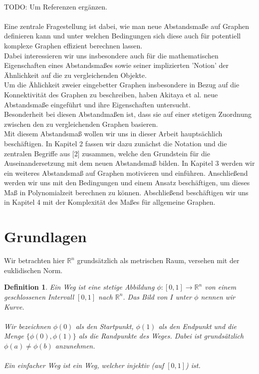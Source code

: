 \documentclass[a4paper, 12pt, twoside]{article}
\theoremstyle{Format1} %
\newtheorem{Def}{Definition}[section]       %
\begin{document}
\\
TODO: Um Referenzen ergänzen.
\\
\\
Eine zentrale Fragestellung ist dabei, wie man neue Abstandsmaße auf Graphen definieren kann und unter welchen Bedingungen sich diese auch für potentiell komplexe Graphen effizient berechnen lassen.
\\
Dabei interessieren wir uns insbesondere auch für die mathematischen Eigenschaften eines Abstandsmaßes sowie seiner implizierten 'Notion' der Ähnlichkeit auf die zu vergleichenden Objekte.
\\
Um die Ählichkeit zweier eingebetter Graphen insbesondere in Bezug auf die Konnektivität des Graphen zu beschreiben, haben Akitaya et al. \cite{Akitaya} neue Abstandsmaße eingeführt und ihre Eigenschaften untersucht.
\\
Besonderheit bei diesen Abstandmaßen ist, dass sie auf einer stetigen Zuordnung zwischen den zu vergleichenden Graphen basieren.
\\

Mit diesem Abstandsmaß wollen wir uns in dieser Arbeit hauptsächlich beschäftigen.
In Kapitel 2 fassen wir dazu zunächst die Notation und die zentralen Begriffe aus [2] zusammen, welche den Grundstein für die Auseinandersetzung mit dem neuen Abstandsmaß bilden.
In Kapitel 3 werden wir ein weiteres Abstandsmaß auf Graphen motivieren und einführen. Anschließend werden wir uns mit den Bedingungen und einem Ansatz beschäftigen, um dieses Maß
in Polynomialzeit berechnen zu können.
Abschließend beschäftigen wir uns in Kapitel 4 mit der Komplexität des Maßes für allgemeine Graphen.
\newpage

\section{Grundlagen}
Wir betrachten hier $ \mathbb{R}^n $ grundsätzlich als metrischen Raum, versehen mit der euklidischen Norm.

\begin{Def}
	Ein \textit{Weg} ist eine stetige Abbildung $ \phi: [0,1] \to \mathbb{R}^n $ von einem geschlossenen Intervall $[0,1]$ nach $\mathbb{R}^n$.
	Das Bild von $I$ unter $\phi$ nennen wir \textit{Kurve}.
	\\
	\\
	Wir bezeichnen $\phi(0)$ als den \textit{Startpunkt}, $\phi(1)$ als den \textit{Endpunkt} und die Menge
	$\{\phi(0), \phi(1)\}$ als die \textit{Randpunkte} des Weges. Dabei ist grundsätzlich $\phi(a) \neq \phi(b)$ anzunehmen.
	\\
	\\
	Ein \textit{einfacher Weg} ist ein Weg, welcher injektiv (auf $[0,1]$) ist.
\end{Def}
\end{document}
